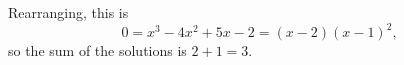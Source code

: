 Rearranging, this is \[0=x^3-4x^2+5x-2=\left(x-2\right)\left(x-1\right)^2,\] so the sum of the solutions is $2+1=\boxed{3}$.
